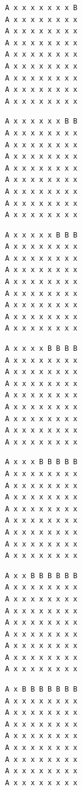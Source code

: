 { \begin{verbatim}
         A x x x x x x x B
         A x x x x x x x x
         A x x x x x x x x
         A x x x x x x x x
         A x x x x x x x x
         A x x x x x x x x
         A x x x x x x x x
         A x x x x x x x x
         A x x x x x x x x
\end{verbatim} }

{ \begin{verbatim}
         A x x x x x x B B
         A x x x x x x x x
         A x x x x x x x x
         A x x x x x x x x
         A x x x x x x x x
         A x x x x x x x x
         A x x x x x x x x
         A x x x x x x x x
         A x x x x x x x x
\end{verbatim} }

{ \begin{verbatim}
         A x x x x x B B B
         A x x x x x x x x
         A x x x x x x x x
         A x x x x x x x x
         A x x x x x x x x
         A x x x x x x x x
         A x x x x x x x x
         A x x x x x x x x
         A x x x x x x x x
\end{verbatim} }

{ \begin{verbatim}
         A x x x x B B B B
         A x x x x x x x x
         A x x x x x x x x
         A x x x x x x x x
         A x x x x x x x x
         A x x x x x x x x
         A x x x x x x x x
         A x x x x x x x x
         A x x x x x x x x
\end{verbatim} }

{ \begin{verbatim}
         A x x x B B B B B
         A x x x x x x x x
         A x x x x x x x x
         A x x x x x x x x
         A x x x x x x x x
         A x x x x x x x x
         A x x x x x x x x
         A x x x x x x x x
         A x x x x x x x x
\end{verbatim} }

{ \begin{verbatim}
         A x x B B B B B B
         A x x x x x x x x
         A x x x x x x x x
         A x x x x x x x x
         A x x x x x x x x
         A x x x x x x x x
         A x x x x x x x x
         A x x x x x x x x
         A x x x x x x x x
\end{verbatim} }

{ \begin{verbatim}
         A x B B B B B B B
         A x x x x x x x x
         A x x x x x x x x
         A x x x x x x x x
         A x x x x x x x x
         A x x x x x x x x
         A x x x x x x x x
         A x x x x x x x x
         A x x x x x x x x
\end{verbatim} }


